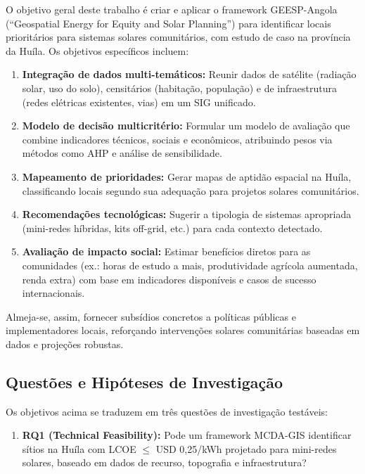 \documentclass[12pt, a4paper]{article}
\begin{document}
\begin{itemize}
O objetivo geral deste trabalho é criar e aplicar o framework GEESP-Angola (``Geospatial Energy for Equity and Solar Planning'') para identificar locais prioritários para sistemas solares comunitários, com estudo de caso na província da Huíla. Os objetivos específicos incluem:

\begin{enumerate}
\item \textbf{Integração de dados multi-temáticos:} Reunir dados de satélite (radiação solar, uso do solo), censitários (habitação, população) e de infraestrutura (redes elétricas existentes, vias) em um SIG unificado.
\item \textbf{Modelo de decisão multicritério:} Formular um modelo de avaliação que combine indicadores técnicos, sociais e econômicos, atribuindo pesos via métodos como AHP e análise de sensibilidade.
\item \textbf{Mapeamento de prioridades:} Gerar mapas de aptidão espacial na Huíla, classificando locais segundo sua adequação para projetos solares comunitários.
\item \textbf{Recomendações tecnológicas:} Sugerir a tipologia de sistemas apropriada (mini-redes híbridas, kits off-grid, etc.) para cada contexto detectado.
\item \textbf{Avaliação de impacto social:} Estimar benefícios diretos para as comunidades (ex.: horas de estudo a mais, produtividade agrícola aumentada, renda extra) com base em indicadores disponíveis e casos de sucesso internacionais.
\end{enumerate}

Almeja-se, assim, fornecer subsídios concretos a políticas públicas e implementadores locais, reforçando intervenções solares comunitárias baseadas em dados e projeções robustas.

\subsection{Questões e Hipóteses de Investigação}

Os objetivos acima se traduzem em três questões de investigação testáveis:

\begin{enumerate}
\item \textbf{RQ1 (Technical Feasibility):} Pode um framework MCDA-GIS identificar sítios na Huíla com LCOE $\leq$ USD 0,25/kWh projetado para mini-redes solares, baseado em dados de recurso, topografia e infraestrutura?


\end{enumerate}
\end{itemize}
\end{document}
